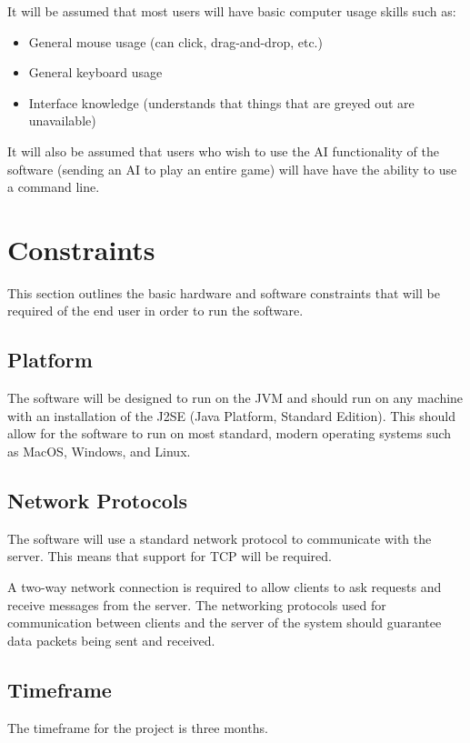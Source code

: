 \documentclass[12pt]{article}
\begin{document}
It will be assumed that most users will have basic computer usage skills such as:
\begin{itemize}
\item General mouse usage (can click, drag-and-drop, etc.)
\item General keyboard usage
\item Interface knowledge (understands that things that are greyed out are unavailable)
\end{itemize}
It will also be assumed that users who wish to use the AI functionality of the software
(sending an AI to play an entire game) will have have the ability to use a command line.


\section{Constraints}

This section outlines the basic hardware and software constraints that
will be required of the end user in order to run the software.

\subsection{Platform}

The software will be designed to run on the JVM and should run on any machine
with an installation of the J2SE (Java Platform, Standard Edition). This should
allow for the software to run on most standard, modern operating systems such
as MacOS, Windows, and Linux.

\subsection{Network Protocols}

The software will use a standard network protocol to communicate with the
server.  This means that support for TCP will be required.

A two-way network connection is required to allow clients to ask requests 
and receive messages from the server. The networking protocols used for 
communication between clients and the server of the system should guarantee 
data packets being sent and received.

\subsection{Timeframe}

The timeframe for the project is three months.
\end{document}
